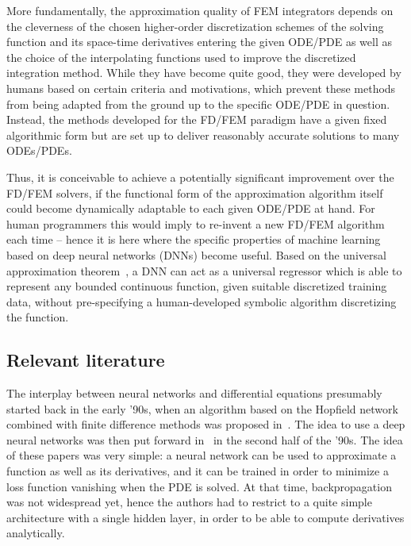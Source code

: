 \documentclass{article}
\begin{document}
More fundamentally, the approximation quality of FEM integrators depends on the cleverness of the chosen higher-order discretization schemes of the solving function and its space-time derivatives entering the given ODE/PDE as well as the choice of the interpolating functions used to improve the discretized integration method. While they have become quite good, they were developed by humans based on certain criteria and motivations, which prevent these methods from being adapted from the ground up to the specific ODE/PDE in question. Instead, the methods developed for the FD/FEM paradigm have a given fixed algorithmic form but are set up to deliver reasonably accurate solutions to many ODEs/PDEs.

Thus, it is conceivable to achieve a potentially significant improvement over the FD/FEM solvers, if the functional form of the approximation algorithm itself could become dynamically adaptable to each given ODE/PDE at hand. For human programmers this would imply to re-invent a new FD/FEM algorithm each time -- hence it is here where the specific properties of machine learning based on deep neural networks (DNNs) become useful. Based on the universal approximation theorem~\cite{cybenko1989approximation, HORNIK1991251, pinkus_1999}, a DNN can act as a universal regressor which is able to represent any bounded continuous function, given suitable discretized training data, without pre-specifying a human-developed symbolic algorithm discretizing the function. 

\subsection{Relevant literature}
\label{sec:Literature}

The interplay between neural networks and differential equations presumably started back in the early '90s, when an algorithm based on the Hopfield network combined with finite difference methods was proposed in~\cite{Lee1990NeuralAF}. The idea to use a deep neural networks was then put forward in~\cite{Lagaris_1998, 870037, Lagaris:1997ap} in the second half of the '90s. The idea of these papers was very simple: a neural network can be used to approximate a function as well as its derivatives, and it can be trained in order to minimize a loss function vanishing when the PDE is solved. At that time, backpropagation was not widespread yet, hence the authors had to restrict to a quite simple architecture with a single hidden layer, in order to be able to compute derivatives analytically.
\end{document}
